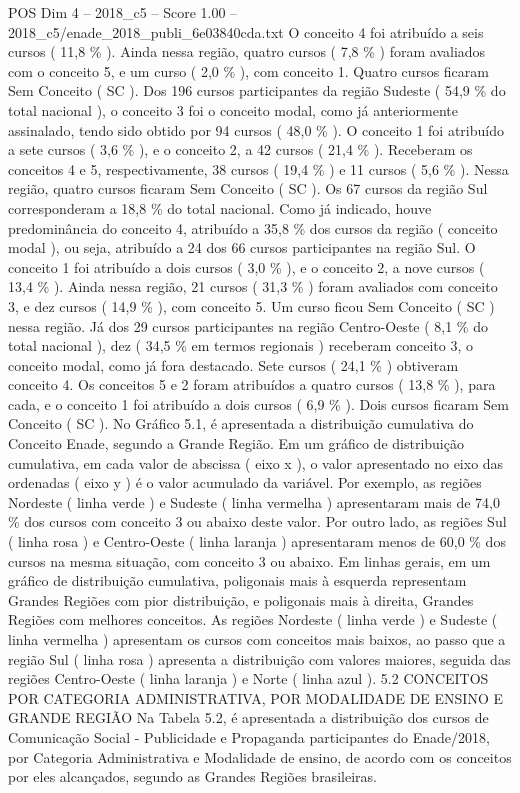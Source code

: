 \begin{textsample}{POS Dim 4 – 2018\_c5 – Score 1.00 – 2018\_c5/enade\_2018\_publi\_6e03840cda.txt}
O conceito 4 foi atribuído a seis cursos ( 11,8 \% ).
Ainda nessa região, quatro cursos ( 7,8 \% ) foram avaliados com o conceito 5, e um curso ( 2,0 \% ), com conceito 1.
Quatro cursos ficaram Sem Conceito ( SC ).
Dos 196 cursos participantes da região Sudeste ( 54,9 \% do total nacional ), o conceito 3 foi o conceito modal, como já anteriormente assinalado, tendo sido obtido por 94 cursos ( 48,0 \% ).
O conceito 1 foi atribuído a sete cursos ( 3,6 \% ), e o conceito 2, a 42 cursos ( 21,4 \% ).
Receberam os conceitos 4 e 5, respectivamente, 38 cursos ( 19,4 \% ) e 11 cursos ( 5,6 \% ).
Nessa região, quatro cursos ficaram Sem Conceito ( SC ).
Os 67 cursos da região Sul corresponderam a 18,8 \% do total nacional.
Como já indicado, houve predominância do conceito 4, atribuído a 35,8 \% dos cursos da região ( conceito modal ), ou seja, atribuído a 24 dos 66 cursos participantes na região Sul.
O conceito 1 foi atribuído a dois cursos ( 3,0 \% ), e o conceito 2, a nove cursos ( 13,4 \% ).
Ainda nessa região, 21 cursos ( 31,3 \% ) foram avaliados com conceito 3, e dez cursos ( 14,9 \% ), com conceito 5.
Um curso ficou Sem Conceito ( SC ) nessa região.
Já dos 29 cursos participantes na região Centro-Oeste ( 8,1 \% do total nacional ), dez ( 34,5 \% em termos regionais ) receberam conceito 3, o conceito modal, como já fora destacado.
Sete cursos ( 24,1 \% ) obtiveram conceito 4.
Os conceitos 5 e 2 foram atribuídos a quatro cursos ( 13,8 \% ), para cada, e o conceito 1 foi atribuído a dois cursos ( 6,9 \% ).
Dois cursos ficaram Sem Conceito ( SC ).
No Gráfico 5.1, é apresentada a distribuição cumulativa do Conceito Enade, segundo a Grande Região.
Em um gráfico de distribuição cumulativa, em cada valor de abscissa ( eixo x ), o valor apresentado no eixo das ordenadas ( eixo y ) é o valor acumulado da variável.
Por exemplo, as regiões Nordeste ( linha verde ) e Sudeste ( linha vermelha ) apresentaram mais de 74,0 \% dos cursos com conceito 3 ou abaixo deste valor.
Por outro lado, as regiões Sul ( linha rosa ) e Centro-Oeste ( linha laranja ) apresentaram menos de 60,0 \% dos cursos na mesma situação, com conceito 3 ou abaixo.
Em linhas gerais, em um gráfico de distribuição cumulativa, poligonais mais à esquerda representam Grandes Regiões com pior distribuição, e poligonais mais à direita, Grandes Regiões com melhores conceitos.
As regiões Nordeste ( linha verde ) e Sudeste ( linha vermelha ) apresentam os cursos com conceitos mais baixos, ao passo que a região Sul ( linha rosa ) apresenta a distribuição com valores maiores, seguida das regiões Centro-Oeste ( linha laranja ) e Norte ( linha azul ). 5.2 CONCEITOS POR CATEGORIA ADMINISTRATIVA, POR MODALIDADE DE ENSINO E GRANDE REGIÃO Na Tabela 5.2, é apresentada a distribuição dos cursos de Comunicação Social - Publicidade e Propaganda participantes do Enade/2018, por Categoria Administrativa e Modalidade de ensino, de acordo com os conceitos por eles alcançados, segundo as Grandes Regiões brasileiras.

\end{textsample}
